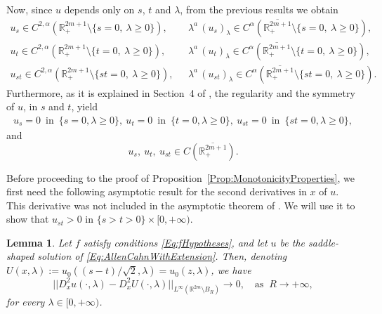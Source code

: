 \documentclass[twoside,leqno,symbols-for-thanks, draft]{rmi}
\numberwithin{equation}{section}
\newtheorem{lemma}[theorem]{Lemma}
\theoremstyle{definition}
\newcommand{\con}[1]{\mathbb{#1}}
\newcommand{\R}{\con{R}} %
\begin{document}
Now, since $u$ depends only on $s$, $t$ and $\lambda$, from the previous results we obtain
\begin{align*}
u_s \in C^{2,\alpha}(\R_+^{2m+1}\setminus\{s=0,\ \lambda \geq 0\}), \,\, &\,\, \lambda^a\,(u_s)_\lambda \in C^{\alpha}(\overline{\R_+^{2m+1}}\setminus\{s=0,\ \lambda \geq 0\}),\\
u_t \in C^{2,\alpha}(\R_+^{2m+1}\setminus\{t=0,\ \lambda \geq 0\}), \,\, &\,\, \lambda^a\,(u_t)_\lambda \in C^{\alpha}(\overline{\R_+^{2m+1}}\setminus\{t=0,\ \lambda \geq 0\}),\\
u_{st} \in C^{2,\alpha}(\R_+^{2m+1}\setminus\{st=0,\ \lambda \geq 0\}), \,\, &\,\, \lambda^a\,(u_{st})_\lambda \in C^{\alpha}(\overline{\R_+^{2m+1}}\setminus\{st=0,\ \lambda \geq 0\}).
\end{align*}
Furthermore, as it is explained in Section~4 of \cite{Cabre-Saddle}, the regularity and the symmetry of $u$, in $s$ and $t$, yield
\begin{align*}
u_s=0 \,\text{ in } \, \{s=0, \lambda \geq 0\}, \ 
u_t=0 \,\text{ in } \, \{t=0, \lambda \geq 0\},  \
u_{st}=0 \,\text{ in } \, \{st=0, \lambda \geq 0\},
\end{align*}
and
$$ u_s, \ u_t,\ u_{st} \in C(\overline{\R^{2m+1}_+}).  $$


Before proceeding to the proof of Proposition~\ref{Prop:MonotonicityProperties}, we first need the following asymptotic result for the second derivatives in $x$ of $u$. This derivative was not included in the asymptotic theorem of \cite{Cinti-Saddle, Cinti-Saddle2}. We will use it to show that $u_{st}>0$ in $\{s>t>0\}\times [0,+\infty)$.

\begin{lemma}
	\label{Lemma:AsymptoticSecondDerivative}
	Let $f$ satisfy conditions \eqref{Eq:fHypotheses}, and let $u$ be the saddle-shaped solution of \eqref{Eq:AllenCahnWithExtension}. Then, denoting $U(x,\lambda) := u_0((s - t)/\sqrt{2},\lambda) = u_0(z,\lambda)$, we have
	$$ ||D^2_x u(\cdot,\lambda) - D^2_x U(\cdot,\lambda)||_{L^\infty(\R^{2m}\setminus B_R)} \to 0, \ \ \ \text{ as } \ R\to+\infty, $$
	for every $\lambda \in [0,+\infty)$.
\end{lemma}
\end{document}
